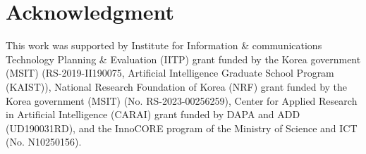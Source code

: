 \section{Acknowledgment}
This work was supported by Institute for Information \& communications Technology Planning \& Evaluation (IITP) grant funded by the Korea government (MSIT) (RS-2019-II190075, Artificial Intelligence Graduate School Program (KAIST)), National Research Foundation of Korea (NRF) grant funded by the Korea government (MSIT) (No. RS-2023-00256259), Center for Applied Research in Artificial Intelligence (CARAI) grant funded by DAPA and ADD (UD190031RD), and the InnoCORE program of the Ministry of Science and ICT (No. N10250156).